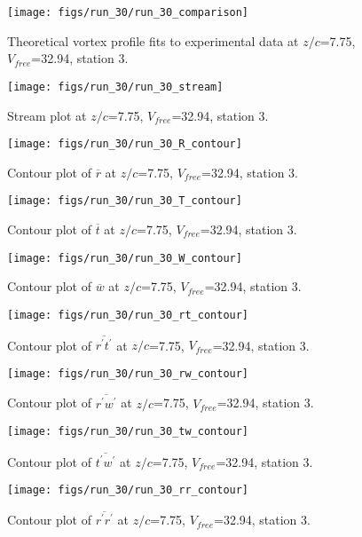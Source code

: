 \begin{figure}[H]
\centering
\texttt{[image: figs/run\_30/run\_30\_comparison]}
\caption{Theoretical vortex profile fits to experimental data at $z/c$=7.75, $V_{free}$=32.94, station 3.}
\end{figure}


\begin{figure}[H]
\centering
\texttt{[image: figs/run\_30/run\_30\_stream]}
\caption{Stream plot at $z/c$=7.75, $V_{free}$=32.94, station 3.}
\end{figure}


\begin{figure}[H]
\centering
\texttt{[image: figs/run\_30/run\_30\_R\_contour]}
\caption{Contour plot of $\overline{r}$ at $z/c$=7.75, $V_{free}$=32.94, station 3.}
\end{figure}


\begin{figure}[H]
\centering
\texttt{[image: figs/run\_30/run\_30\_T\_contour]}
\caption{Contour plot of $\overline{t}$ at $z/c$=7.75, $V_{free}$=32.94, station 3.}
\end{figure}


\begin{figure}[H]
\centering
\texttt{[image: figs/run\_30/run\_30\_W\_contour]}
\caption{Contour plot of $\overline{w}$ at $z/c$=7.75, $V_{free}$=32.94, station 3.}
\end{figure}


\begin{figure}[H]
\centering
\texttt{[image: figs/run\_30/run\_30\_rt\_contour]}
\caption{Contour plot of $\overline{r^\prime t^\prime}$ at $z/c$=7.75, $V_{free}$=32.94, station 3.}
\end{figure}


\begin{figure}[H]
\centering
\texttt{[image: figs/run\_30/run\_30\_rw\_contour]}
\caption{Contour plot of $\overline{r^\prime w^\prime}$ at $z/c$=7.75, $V_{free}$=32.94, station 3.}
\end{figure}


\begin{figure}[H]
\centering
\texttt{[image: figs/run\_30/run\_30\_tw\_contour]}
\caption{Contour plot of $\overline{t^\prime w^\prime}$ at $z/c$=7.75, $V_{free}$=32.94, station 3.}
\end{figure}


\begin{figure}[H]
\centering
\texttt{[image: figs/run\_30/run\_30\_rr\_contour]}
\caption{Contour plot of $\overline{r^\prime r^\prime}$ at $z/c$=7.75, $V_{free}$=32.94, station 3.}
\end{figure}


